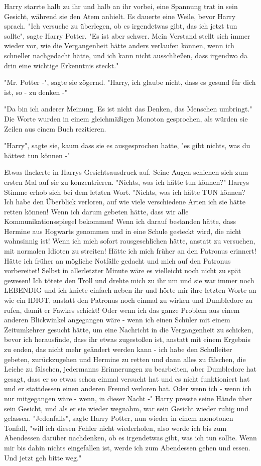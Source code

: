 {Harry starrte halb zu ihr und halb an ihr vorbei, eine Spannung trat in sein Gesicht, während sie den Atem anhielt. Es dauerte eine Weile, bevor Harry sprach. "Ich versuche zu überlegen, ob es irgendetwas gibt, das ich jetzt tun sollte", sagte Harry Potter. "Es ist aber schwer. Mein Verstand stellt sich immer wieder vor, wie die Vergangenheit hätte anders verlaufen können, wenn ich schneller nachgedacht hätte, und ich kann nicht ausschließen, dass irgendwo da drin eine wichtige Erkenntnis steckt."

"Mr. Potter -", sagte sie zögernd. "Harry, ich glaube nicht, dass es gesund für dich ist, so - zu denken -"

"Da bin ich anderer Meinung. Es ist nicht das Denken, das Menschen umbringt." Die Worte wurden in einem gleichmäßigen Monoton gesprochen, als würden sie Zeilen aus einem Buch rezitieren.

"Harry", sagte sie, kaum dass sie es ausgesprochen hatte, "es gibt nichts, was du hättest tun können -"

Etwas flackerte in Harrys Gesichtsausdruck auf. Seine Augen schienen sich zum ersten Mal auf sie zu konzentrieren. "Nichts, was ich hätte tun können?" Harrys Stimme erhob sich bei dem letzten Wort. "Nichts, was ich hätte TUN können? Ich habe den Überblick verloren, auf wie viele verschiedene Arten ich sie hätte retten können! Wenn ich darum gebeten hätte, dass wir alle Kommunikationsspiegel bekommen! Wenn ich darauf bestanden hätte, dass Hermine aus Hogwarts genommen und in eine Schule gesteckt wird, die nicht wahnsinnig ist! Wenn ich mich sofort rausgeschlichen hätte, anstatt zu versuchen, mit normalen Idioten zu streiten! Hätte ich mich früher an den Patronus erinnert! Hätte ich früher an mögliche Notfälle gedacht und mich auf den Patronus vorbereitet! Selbst in allerletzter Minute wäre es vielleicht noch nicht zu spät gewesen! Ich tötete den Troll und drehte mich zu ihr um und sie war immer noch LEBENDIG und ich kniete einfach neben ihr und hörte mir ihre letzten Worte an wie ein IDIOT, anstatt den Patronus noch einmal zu wirken und Dumbledore zu rufen, damit er Fawkes schickt! Oder wenn ich das ganze Problem aus einem anderen Blickwinkel angegangen wäre - wenn ich einen Schüler mit einem Zeitumkehrer gesucht hätte, um eine Nachricht in die Vergangenheit zu schicken, bevor ich herausfinde, dass ihr etwas zugestoßen ist, anstatt mit einem Ergebnis zu enden, das nicht mehr geändert werden kann - ich habe den Schulleiter gebeten, zurückzugehen und Hermine zu retten und dann alles zu fälschen, die Leiche zu fälschen, jedermanns Erinnerungen zu bearbeiten, aber Dumbledore hat gesagt, dass er so etwas schon einmal versucht hat und es nicht funktioniert hat und er stattdessen einen anderen Freund verloren hat. Oder wenn ich - wenn ich nur mitgegangen wäre - wenn, in dieser Nacht -" Harry presste seine Hände über sein Gesicht, und als er sie wieder wegnahm, war sein Gesicht wieder ruhig und gelassen. "Jedenfalls", sagte Harry Potter, nun wieder in einem monotonen Tonfall, "will ich diesen Fehler nicht wiederholen, also werde ich bis zum Abendessen darüber nachdenken, ob es irgendetwas gibt, was ich tun sollte. Wenn mir bis dahin nichts eingefallen ist, werde ich zum Abendessen gehen und essen. Und jetzt geh bitte weg."

}
